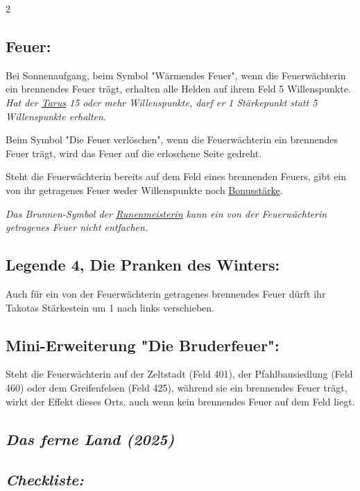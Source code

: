 \documentclass[10pt, a4paper, oneside]{book}
\newcommand{\fan}[1]{\textit{#1}}
\begin{document}
\begin{multicols*}{2}
\begin{bgcolor}
\subsection{Feuer:}
Bei Sonnenaufgang, beim Symbol "Wärmendes Feuer", wenn die Feuerwächterin ein brennendes Feuer trägt, erhalten alle Helden auf ihrem Feld 5 Willenspunkte.
\supercite{dek-begleitheft} 
\fan{Hat der \hyperref[tarus]{Tarus} 15 oder mehr Willenspunkte, darf er 1 Stärkepunkt statt 5 Willenspunkte erhalten.}  

Beim Symbol "Die Feuer verlöschen", wenn die Feuerwächterin ein brennendes Feuer trägt, wird das Feuer auf die erloschene Seite gedreht. 

Steht die Feuerwächterin bereits auf dem Feld eines brennenden Feuers, gibt ein von ihr getragenes Feuer weder Willenspunkte noch \hyperref[bonusstaerke]{Bonusstärke}.
\supercite{101489}

\fan{Das Brunnen-Symbol der \hyperref[runenmeisterin]{Runenmeisterin} kann ein von der Feuerwächterin getragenes Feuer nicht entfachen.}



\subsection{Legende 4, Die Pranken des Winters:}

Auch für ein von der Feuerwächterin getragenes brennendes Feuer dürft ihr Takotas Stärkestein um 1 nach links verschieben.
\supercite{dek4-takota}


\subsection{Mini-Erweiterung "Die Bruderfeuer":}


Steht die Feuerwächterin auf der Zeltstadt (Feld 401), der Pfahlbausiedlung (Feld 460) oder dem Greifenfelsen (Feld 425), während sie ein brennendes Feuer trägt, wirkt der Effekt dieses Orts, auch wenn kein brennendes Feuer auf dem Feld liegt.
\supercite{me-bruderfeuer}

\end{bgcolor}


\begin{bgcolor}
\section{\fan{Das ferne Land (2025)}}


\subsection{\fan{Checkliste:}}


\end{bgcolor}
\end{multicols*}
\end{document}
